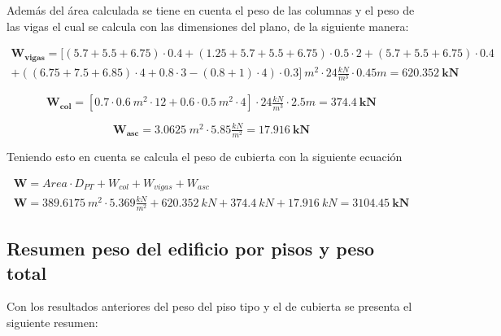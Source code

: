 \documentclass[12pt]{article}
\begin{document}
Además del área calculada se tiene en cuenta el peso de las columnas  y el peso de las vigas el cual se calcula con las dimensiones del plano, de la siguiente manera:

\begin{gather*}
    \mathbf{W_{vigas}}=[(5.7+5.5+6.75)\cdot0.4+(1.25+5.7+5.5+6.75)\cdot0.5\cdot2+(5.7+5.5+6.75)\cdot0.4\\ +((6.75+7.5+6.85)\cdot4+0.8\cdot3-(0.8+1)\cdot4)\cdot0.3]~m^{2}\cdot24\tfrac{kN}{m^{3}}\cdot0.45m=\mathbf{620.352~kN}
\end{gather*}

\begin{equation*}
    \mathbf{W_{col}}=[0.7\cdot0.6~m^{2}\cdot12+0.6\cdot0.5~m^{2}\cdot4]\cdot 24 \tfrac{kN}{m^{3}} \cdot 2.5 m=\mathbf{374.4~kN}
\end{equation*}

\begin{equation*}
    \mathbf{W_{asc}}=3.0625\;m^2\cdot 5.85\tfrac{kN}{m^2}=\mathbf{17.916~kN}
\end{equation*}

Teniendo esto en cuenta se calcula el peso de cubierta con la siguiente ecuación

\begin{gather*}
    \mathbf{W}=Area\cdot D_{PT}+W_{col}+W_{vigas}+W_{asc}\\
    \mathbf{W}=389.6175~m^{2}\cdot 5.369\tfrac{kN}{m^{2}}+620.352~kN+374.4~kN+17.916~kN=\mathbf{3104.45~kN}
\end{gather*}

\subsection{Resumen peso del edificio por pisos y peso total}

Con los resultados anteriores del peso del piso tipo y el de cubierta se presenta el siguiente resumen:
\end{document}
